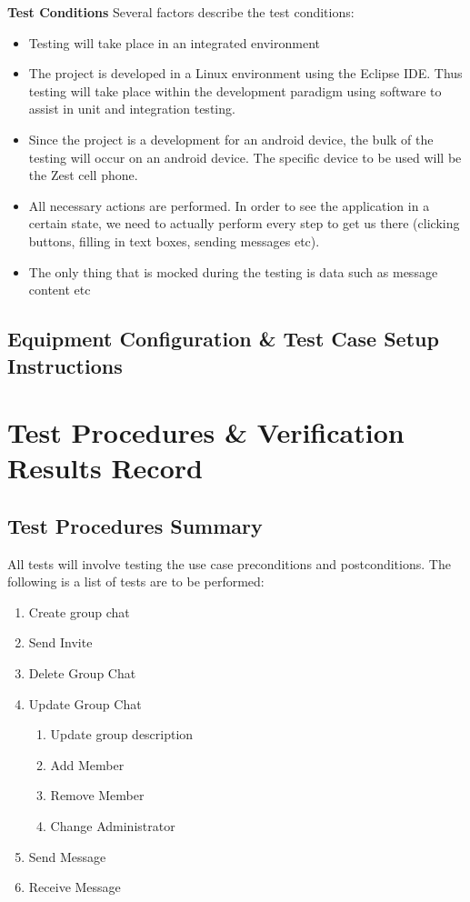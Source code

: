 \documentclass[11pt]{article}
\begin{document}
\textbf{Test Conditions}
Several factors describe the test conditions:
\begin{itemize}
\item Testing will take place in an integrated environment
\item The project is developed in a Linux environment using the Eclipse IDE. Thus testing will take place within the development paradigm using software to assist in unit and integration testing.
\item Since the project is a development for an android device, the bulk of the testing will occur on an android device. The specific device to be used will be the Zest cell phone.
\item All necessary actions are performed. In order to see the application in a certain state, we need to actually perform every step to get us there (clicking buttons, filling in text boxes, sending messages etc).
\item The only thing that is mocked during the testing is data such as message content etc
\end{itemize}



\subsection{Equipment Configuration \& Test Case Setup Instructions}


\section{Test Procedures \& Verification Results Record}
\subsection{Test Procedures Summary}
All tests will involve testing the use case preconditions and postconditions.
The following is a list of tests are to be performed:
\begin{enumerate}
\item Create group chat
\item Send Invite
\item Delete Group Chat
\item Update Group Chat
\begin{enumerate}
\item Update group description
\item Add Member
\item Remove Member
\item Change Administrator 
\end{enumerate}
\item Send Message
\item Receive Message
\end{enumerate}
\end{document}
